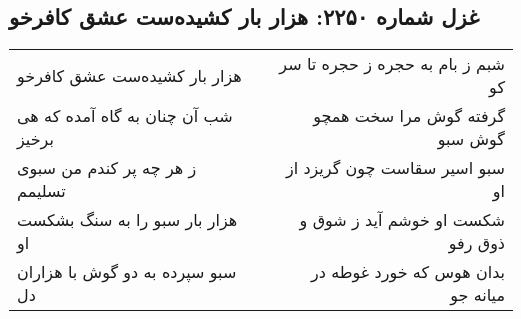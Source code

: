 \begin{center}
\section*{غزل شماره ۲۲۵۰: هزار بار کشیده‌ست عشق کافرخو}
\label{sec:2250}
\begin{longtable}{l p{0.5cm} r}
هزار بار کشیده‌ست عشق کافرخو
&&
شبم ز بام به حجره ز حجره تا سر کو
\\
شب آن چنان به گاه آمده که هی برخیز
&&
گرفته گوش مرا سخت همچو گوش سبو
\\
ز هر چه پر کندم من سبوی تسلیمم
&&
سبو اسیر سقاست چون گریزد از او
\\
هزار بار سبو را به سنگ بشکست او
&&
شکست او خوشم آید ز شوق و ذوق رفو
\\
سبو سپرده به دو گوش با هزاران دل
&&
بدان هوس که خورد غوطه در میانه جو
\\
\end{longtable}
\end{center}
